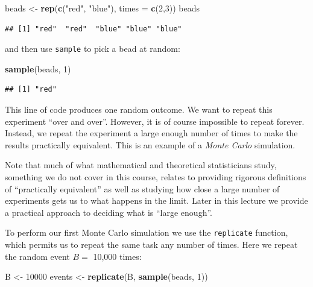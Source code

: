 \documentclass[
  openany]{book}
\newenvironment{Shaded}{\begin{snugshade}}{\end{snugshade}}
\newcommand{\DataTypeTok}[1]{\textcolor[rgb]{0.13,0.29,0.53}{#1}}
\newcommand{\DecValTok}[1]{\textcolor[rgb]{0.00,0.00,0.81}{#1}}
\newcommand{\KeywordTok}[1]{\textcolor[rgb]{0.13,0.29,0.53}{\textbf{#1}}}
\newcommand{\NormalTok}[1]{#1}
\newcommand{\StringTok}[1]{\textcolor[rgb]{0.31,0.60,0.02}{#1}}
\begin{document}
\begin{Shaded}
\begin{Highlighting}[]
\NormalTok{beads <-}\StringTok{ }\KeywordTok{rep}\NormalTok{(}\KeywordTok{c}\NormalTok{(}\StringTok{"red"}\NormalTok{, }\StringTok{"blue"}\NormalTok{), }\DataTypeTok{times =} \KeywordTok{c}\NormalTok{(}\DecValTok{2}\NormalTok{,}\DecValTok{3}\NormalTok{))}
\NormalTok{beads}
\end{Highlighting}
\end{Shaded}

\begin{verbatim}
## [1] "red"  "red"  "blue" "blue" "blue"
\end{verbatim}

and then use \texttt{sample} to pick a bead at random:

\begin{Shaded}
\begin{Highlighting}[]
\KeywordTok{sample}\NormalTok{(beads, }\DecValTok{1}\NormalTok{)}
\end{Highlighting}
\end{Shaded}

\begin{verbatim}
## [1] "red"
\end{verbatim}

This line of code produces one random outcome. We want to repeat this experiment ``over and over''. However, it is of course impossible to repeat forever. Instead, we repeat the experiment a large enough number of times to make the results practically equivalent. This is an example of a \emph{Monte Carlo} simulation.

Note that much of what mathematical and theoretical statisticians study, something we do not cover in this course, relates to providing rigorous definitions of ``practically equivalent'' as well as studying how close a large number of experiments gets us to what happens in the limit. Later in this lecture we provide a practical approach to deciding what is ``large enough''.

To perform our first Monte Carlo simulation we use the \texttt{replicate} function, which permits us to repeat the same task any number of times. Here we repeat the random event \(B=\) 10,000 times:

\begin{Shaded}
\begin{Highlighting}[]
\NormalTok{B <-}\StringTok{ }\DecValTok{10000}
\NormalTok{events <-}\StringTok{ }\KeywordTok{replicate}\NormalTok{(B, }\KeywordTok{sample}\NormalTok{(beads, }\DecValTok{1}\NormalTok{))}
\end{Highlighting}
\end{Shaded}
\end{document}
